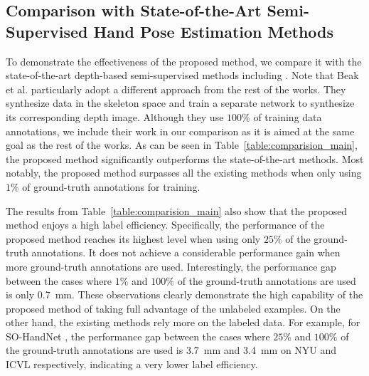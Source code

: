 \documentclass{article}
\begin{document}
\subsection{Comparison with State-of-the-Art Semi-Supervised Hand Pose Estimation Methods}
To demonstrate the effectiveness of the proposed method, we compare it with the state-of-the-art depth-based semi-supervised methods including \cite{chen2019so,wan2017crossing,baek2018augmented,abdi20183d}. Note that Beak et al. \cite{baek2018augmented} particularly adopt a different approach from the rest of the works. They synthesize data in the skeleton space and train a separate network to synthesize its corresponding depth image. Although they use $100\%$ of training data annotations, we include their work in our comparison as it is aimed at the same goal as the rest of the works. As can be seen in Table~\ref{table:comparision_main}, the proposed method significantly outperforms the state-of-the-art methods. Most notably, the proposed method surpasses all the existing methods when only using $1\%$ of ground-truth annotations for training. 
\par
The results from Table~\ref{table:comparision_main} also show that the proposed method enjoys a high label efficiency. Specifically, the performance of the proposed method reaches its highest level when using only $25\%$ of the ground-truth annotations. It does not achieve a considerable performance gain when more ground-truth annotations are used. Interestingly, the performance gap between the cases where $1\%$ and $100\%$ of the ground-truth annotations are used is only 0.7~mm. These observations clearly demonstrate the high capability of the proposed method of taking full advantage of the unlabeled examples. On the other hand, the existing methods rely more on the labeled data. For example, for SO-HandNet \cite{chen2019so}, the performance gap between the cases where $25\%$ and $100\%$ of the ground-truth annotations are used is 3.7~mm and 3.4~mm on NYU and ICVL respectively, indicating a very lower label efficiency.
\end{document}
